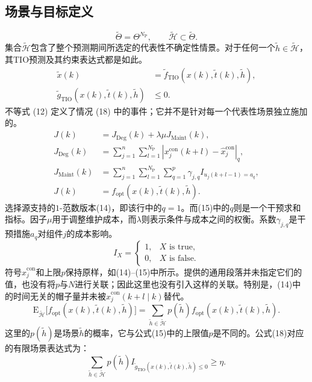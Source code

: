 \documentclass{article}
\begin{document}
\subsection*{场景与目标定义}
\[
\tilde\Theta=\Theta^{N_{\mathrm P}},\qquad
\tilde{\mathcal H}\subset\tilde\Theta.
\]
集合$\tilde{\mathcal H}$包含了整个预测期间所选定的代表性不确定性情景。对于任何一个$\tilde h\in\tilde{\mathcal H}$，其TIO预测及其约束表达式都是如此。
\begin{align}
\tilde x(k)&=\tilde f_{\mathrm{TIO}}(x(k),\tilde t(k),\tilde h), \tag{11}\\
\tilde g_{\mathrm{TIO}}(x(k),\tilde t(k),\tilde h)&\leq0. \tag{12}
\end{align}
不等式 (12) 定义了情况 (18) 中的事件；它并不是针对每一个代表性场景独立施加的。
\begin{align}
J(k)&=J_{\mathrm{Deg}}(k)+\lambda\mu J_{\mathrm{Maint}}(k), \tag{13}\\
J_{\mathrm{Deg}}(k)&=\sum_{j=1}^{n}\sum_{l=1}^{N_{\mathrm P}}
\left|x_j^{\mathrm{con}}(k+l)-\hat x_j^{\mathrm{con}}\right|_q, \tag{14}\\
J_{\mathrm{Maint}}(k)&=\sum_{j=1}^{n}\sum_{l=1}^{N_{\mathrm P}}\sum_{q=1}^{p}
\gamma_{j,q}I_{u_j(k+l-1)=a_q}, \tag{15}\\
J(k)&=f_{\mathrm{opt}}(x(k),\tilde t(k),\tilde h). \tag{16}
\end{align}
选择源支持的$1$-范数版本(14)，即该行中的$q=1$。而(15)中的$q$则是一个干预求和指标。因子$\mu$用于调整维护成本，而$\lambda$则表示条件与成本之间的权衡。系数$\gamma_{j,q}$是干预措施$a_q$对组件$j$的成本影响。
\[
I_X=\begin{cases}1,&X\text{ is true},\\0,&X\text{ is false}.\end{cases}
\]
符号$\hat x_j^{\mathrm{con}}$和上限$p$保持原样，如(14)--(15)中所示。提供的通用段落并未指定它们的值，也没有将$p$与$N$进行关联；因此这里也没有引入这样的关联。特别是，(14)中的时间无关的帽子量并未被$\hat x_j^{\mathrm{con}}(k+l\mid k)$替代。
\begin{equation}
\mathrm E_{\tilde{\mathcal H}}\bigl[f_{\mathrm{opt}}(x(k),\tilde t(k),\tilde h)\bigr]
=\sum_{\tilde h\in\tilde{\mathcal H}}p(\tilde h)
 f_{\mathrm{opt}}(x(k),\tilde t(k),\tilde h).\tag{20}
\end{equation}
这里的$p(\tilde h)$是场景$\tilde h$的概率，它与公式(15)中的上限值$p$是不同的。公式(18)对应的有限场景表达式为：
\begin{equation}
\sum_{\tilde h\in\tilde{\mathcal H}}p(\tilde h)
 I_{\tilde g_{\mathrm{TIO}}(x(k),\tilde t(k),\tilde h)\leq0}\geq\eta.\tag{21}
\end{equation}
\end{document}
